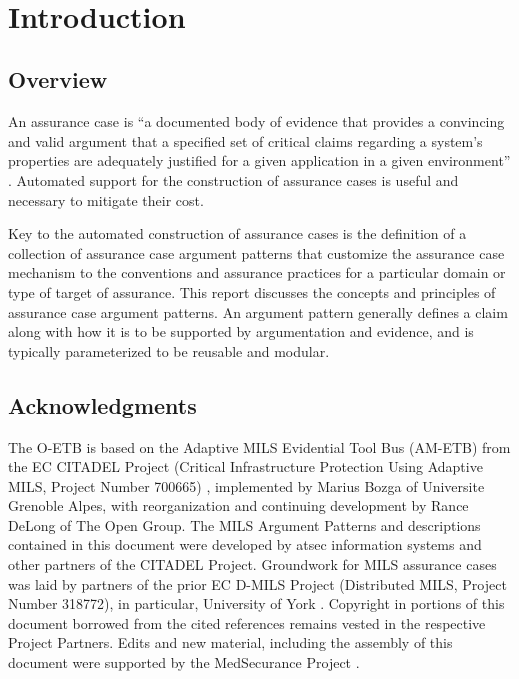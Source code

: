 \documentclass[12pt,twoside,a4paper]{article}
\begin{document}
\firstpage
\newpage
~

\newpage
\tableofcontents
\newpage
\listoffigures
\newpage
\clearpage
{}

\section{Introduction}\label{sec:introduction}
\subsection{Overview}
An assurance case is ``a documented body of evidence that provides a convincing and valid argument that a specified set of critical claims regarding a system's properties are adequately justified for a given application in a given environment'' \cite{Ankrum-06}.
Automated support for the construction of assurance cases is useful and necessary to mitigate their cost.

Key to the automated construction of assurance cases is the definition of a collection of assurance case argument patterns that customize the assurance case mechanism to the conventions and assurance practices for a particular domain or type of target of assurance.
This report discusses the concepts and principles of assurance case argument patterns.
An argument pattern generally defines a claim along with how it is to be supported by argumentation and evidence, and is typically
parameterized to be reusable and modular.

\subsection{Acknowledgments}The O-ETB is based on the Adaptive MILS Evidential Tool Bus (AM-ETB) from the EC CITADEL Project  (Critical Infrastructure Protection Using Adaptive MILS, Project Number 700665)
\cite{CITADEL-WWW,CITADEL-D5.1,CITADEL-D5.4,CITADEL-D5.4a},
implemented by Marius Bozga of Universite Grenoble Alpes, with reorganization and continuing development by Rance DeLong of The Open Group.
The MILS Argument Patterns and descriptions contained in this document were developed by atsec information systems and other partners of the CITADEL Project.
Groundwork for MILS assurance cases was laid by partners of the prior EC D-MILS Project (Distributed MILS, Project Number 318772), in particular, University of York
\cite{D-MILS-WWW,D-MILS-D2.3,D-MILS-D2.4,D-MILS-D4.2,D-MILS-D4.3}.
Copyright in portions of this document borrowed from the cited references remains vested in the respective Project Partners.
Edits and new material, including the assembly of this document were supported by the MedSecurance Project
\cite{MedSecurance-WWW}.
\end{document}
